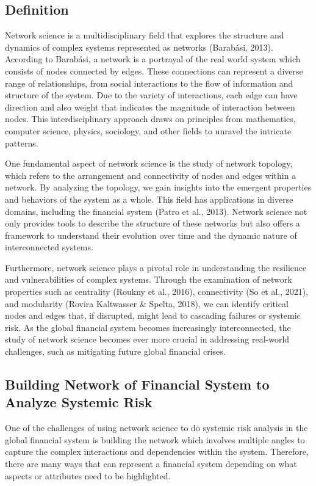 \documentclass[a4paper,11pt]{article}
\begin{document}
\subsection{Definition}
Network science is a multidisciplinary field that explores the structure and dynamics of complex systems represented as networks (Barabási, 2013). According to Barabási, a network is a portrayal of the real world system which consists of nodes connected by edges. These connections can represent a diverse range of relationships, from social interactions to the flow of information and structure of the system. Due to the variety of interactions, each edge can have direction and also weight that indicates the magnitude of interaction between nodes. This interdisciplinary approach draws on principles from mathematics, computer science, physics, sociology, and other fields to unravel the intricate patterns.

One fundamental aspect of network science is the study of network topology, which refers to the arrangement and connectivity of nodes and edges within a network. By analyzing the topology, we gain insights into the emergent properties and behaviors of the system as a whole. This field has applications in diverse domains, including the financial system (Patro et al., 2013). Network science not only provides tools to describe the structure of these networks but also offers a framework to understand their evolution over time and the dynamic nature of interconnected systems.

Furthermore, network science plays a pivotal role in understanding the resilience and vulnerabilities of complex systems. Through the examination of network properties such as centrality (Roukny et al., 2016), connectivity (So et al., 2021), and modularity (Rovira Kaltwasser \& Spelta, 2018), we can identify critical nodes and edges that, if disrupted, might lead to cascading failures or systemic risk. As the global financial system becomes increasingly interconnected, the study of network science becomes ever more crucial in addressing real-world challenges, such as mitigating future global financial crises.

\subsection{Building Network of Financial System to Analyze Systemic Risk}
One of the challenges of using network science to do systemic risk analysis in the global financial system is building the network which involves multiple angles to capture the complex interactions and dependencies within the system. Therefore, there are many ways that can represent a financial system depending on what aspects or attributes need to be highlighted.
\end{document}
